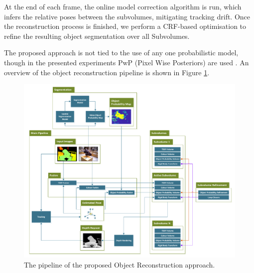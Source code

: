 At the end of each frame, the online model correction algorithm is run, which
infers the relative poses between the subvolumes, mitigating tracking drift.
Once the reconstruction process is finished, we perform a CRF-based optimisation
to refine the resulting object segmentation over all Subvolumes.

The proposed approach is not tied to the use of any one probabilistic model,
though in the presented experiments PwP (Pixel Wise Posteriors) are used
\cite{Bibby2008}. An overview of the object reconstruction pipeline is shown in
Figure \ref{fig:probobj_pipeline_diagram}.

\begin{figure}[ht]
  \label{fig:probobj_pipeline_diagram}
  \centering
  \includegraphics[width=\linewidth]{figures/object_recon/pipeline.pdf}
  \caption[Probabilistic Object Reconstruction Pipeline]
  {The pipeline of the proposed Object Reconstruction approach.}
\end{figure}

